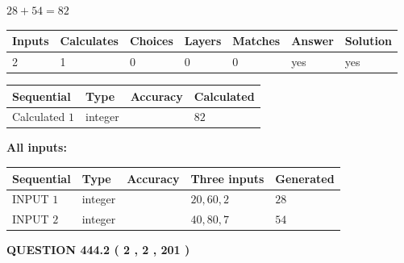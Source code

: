 \documentclass[12pt]{article}
\begin{document}
 

$ %
28 +  %
54=   %
82$
 
 
\noindent{}
 
 

 
   
   
   
   
\noindent\begin{tabular}{|l|l|l|l|l|l|l|}
 \hline
Inputs & Calculates & Choices & Layers & Matches & Answer & Solution \\ \hline
 2  & 
 1  & 
 0
  & 
 0  & 
 0  & 
  yes & 
  yes 
  \\ \hline
 \end{tabular}
   
   
   
   
\noindent{}
   
   
  
  
\noindent\begin{tabular}{|l|l|l|l|}
\hline
 Sequential & Type & Accuracy & Calculated \\ 
\hline
 
 
  Calculated $  1 $ & integer &  & 
  $ 82 $ 
 \\  \hline  
 \end{tabular}
   
   
   
   
\noindent\vspace{0.1in}\hspace{-0.08in} {\textbf{\Large{All inputs: }}}
   
   
  
  
\noindent\begin{tabular}{|l|l|l|l|l|}
\hline
 Sequential & Type & Accuracy & Three inputs & Generated \\ 
\hline
 
 
  INPUT $  1 $ & integer &  & $
 20
 , 
 60
 , 
 2
 $ & $ 28 $ 
 \\  \hline  
 
 
  INPUT $  2 $ & integer &  & $
 40
 , 
 80
 , 
 7
 $ & $ 54 $ 
 \\  \hline  
 \end{tabular}
   
   
  
\vspace{0.2in}
  
{\textbf{\Large{QUESTION
444.2 
 ( 2 , 2 , 201 )
}}}
  
\end{document}
